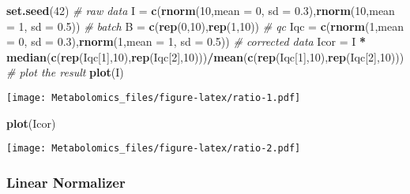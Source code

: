 \documentclass[
]{book}
\newenvironment{Shaded}{\begin{snugshade}}{\end{snugshade}}
\newcommand{\CommentTok}[1]{\textcolor[rgb]{0.56,0.35,0.01}{\textit{#1}}}
\newcommand{\DataTypeTok}[1]{\textcolor[rgb]{0.13,0.29,0.53}{#1}}
\newcommand{\DecValTok}[1]{\textcolor[rgb]{0.00,0.00,0.81}{#1}}
\newcommand{\FloatTok}[1]{\textcolor[rgb]{0.00,0.00,0.81}{#1}}
\newcommand{\KeywordTok}[1]{\textcolor[rgb]{0.13,0.29,0.53}{\textbf{#1}}}
\newcommand{\NormalTok}[1]{#1}
\newcommand{\OperatorTok}[1]{\textcolor[rgb]{0.81,0.36,0.00}{\textbf{#1}}}
\newcommand{\StringTok}[1]{\textcolor[rgb]{0.31,0.60,0.02}{#1}}
\begin{document}
\begin{Shaded}
\begin{Highlighting}[]
\KeywordTok{set.seed}\NormalTok{(}\DecValTok{42}\NormalTok{)}
\CommentTok{# raw data}
\NormalTok{I =}\StringTok{ }\KeywordTok{c}\NormalTok{(}\KeywordTok{rnorm}\NormalTok{(}\DecValTok{10}\NormalTok{,}\DataTypeTok{mean =} \DecValTok{0}\NormalTok{, }\DataTypeTok{sd =} \FloatTok{0.3}\NormalTok{),}\KeywordTok{rnorm}\NormalTok{(}\DecValTok{10}\NormalTok{,}\DataTypeTok{mean =} \DecValTok{1}\NormalTok{, }\DataTypeTok{sd =} \FloatTok{0.5}\NormalTok{))}
\CommentTok{# batch}
\NormalTok{B =}\StringTok{ }\KeywordTok{c}\NormalTok{(}\KeywordTok{rep}\NormalTok{(}\DecValTok{0}\NormalTok{,}\DecValTok{10}\NormalTok{),}\KeywordTok{rep}\NormalTok{(}\DecValTok{1}\NormalTok{,}\DecValTok{10}\NormalTok{))}
\CommentTok{# qc}
\NormalTok{Iqc =}\StringTok{ }\KeywordTok{c}\NormalTok{(}\KeywordTok{rnorm}\NormalTok{(}\DecValTok{1}\NormalTok{,}\DataTypeTok{mean =} \DecValTok{0}\NormalTok{, }\DataTypeTok{sd =} \FloatTok{0.3}\NormalTok{),}\KeywordTok{rnorm}\NormalTok{(}\DecValTok{1}\NormalTok{,}\DataTypeTok{mean =} \DecValTok{1}\NormalTok{, }\DataTypeTok{sd =} \FloatTok{0.5}\NormalTok{))}
\CommentTok{# corrected data}
\NormalTok{Icor =}\StringTok{ }\NormalTok{I }\OperatorTok{*}\StringTok{ }\KeywordTok{median}\NormalTok{(}\KeywordTok{c}\NormalTok{(}\KeywordTok{rep}\NormalTok{(Iqc[}\DecValTok{1}\NormalTok{],}\DecValTok{10}\NormalTok{),}\KeywordTok{rep}\NormalTok{(Iqc[}\DecValTok{2}\NormalTok{],}\DecValTok{10}\NormalTok{)))}\OperatorTok{/}\KeywordTok{mean}\NormalTok{(}\KeywordTok{c}\NormalTok{(}\KeywordTok{rep}\NormalTok{(Iqc[}\DecValTok{1}\NormalTok{],}\DecValTok{10}\NormalTok{),}\KeywordTok{rep}\NormalTok{(Iqc[}\DecValTok{2}\NormalTok{],}\DecValTok{10}\NormalTok{)))}
\CommentTok{# plot the result}
\KeywordTok{plot}\NormalTok{(I)}
\end{Highlighting}
\end{Shaded}

\texttt{[image: Metabolomics\_files/figure-latex/ratio-1.pdf]}

\begin{Shaded}
\begin{Highlighting}[]
\KeywordTok{plot}\NormalTok{(Icor)}
\end{Highlighting}
\end{Shaded}

\texttt{[image: Metabolomics\_files/figure-latex/ratio-2.pdf]}

\hypertarget{linear-normalizer}{%
\subsubsection{Linear Normalizer}\label{linear-normalizer}}
\end{document}
